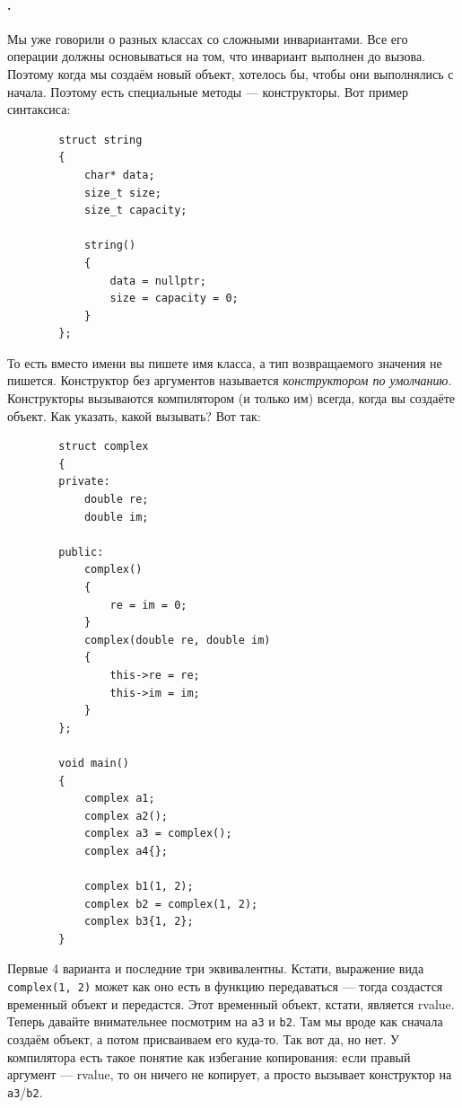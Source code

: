 \documentclass{article}
\begin{document}
    \paragraph{.}
    Мы уже говорили о разных классах со сложными инвариантами. Все его операции должны основываться на том, что инвариант выполнен до вызова. Поэтому когда мы создаём новый объект, хотелось бы, чтобы они выполнялись с начала. Поэтому есть специальные методы --- конструкторы. Вот пример синтаксиса:
    \begin{verbatim}
        struct string
        {
            char* data;
            size_t size;
            size_t capacity;

            string()
            {
                data = nullptr;
                size = capacity = 0;
            }
        };
    \end{verbatim}
    То есть вместо имени вы пишете имя класса, а тип возвращаемого значения не пишется. Конструктор без аргументов называется \textit{конструктором по умолчанию}. Конструкторы вызываются компилятором (и только им) всегда, когда вы создаёте объект. Как указать, какой вызывать? Вот так:
    \begin{verbatim}
        struct complex
        {
        private:
            double re;
            double im;

        public:
            complex()
            {
                re = im = 0;
            }
            complex(double re, double im)
            {
                this->re = re;
                this->im = im;
            }
        };

        void main()
        {
            complex a1;
            complex a2();
            complex a3 = complex();
            complex a4{};

            complex b1(1, 2);
            complex b2 = complex(1, 2);
            complex b3{1, 2};
        }
    \end{verbatim}
    Первые 4 варианта и последние три эквивалентны. Кстати, выражение вида \texttt{complex(1, 2)} может как оно есть в функцию передаваться --- тогда создастся временный объект и передастся. Этот временный объект, кстати, является rvalue. Теперь давайте внимательнее посмотрим на \texttt{a3} и \texttt{b2}. Там мы вроде как сначала создаём объект, а потом присваиваем его куда-то. Так вот да, но нет. У компилятора есть такое понятие как избегание копирования: если правый аргумент --- rvalue, то он ничего не копирует, а просто вызывает конструктор на \texttt{a3}/\texttt{b2}.\\
\end{document}
